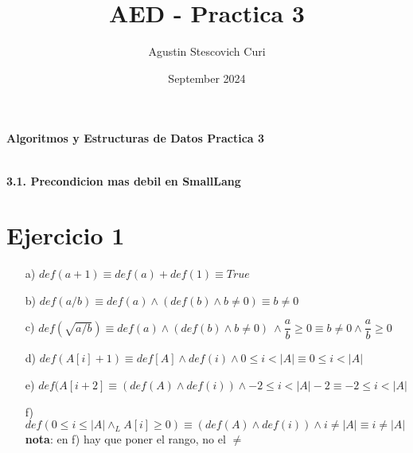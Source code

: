 \documentclass{article}
\title{AED - Practica 3}
\author{Agustin Stescovich Curi}
\date{September 2024}
\begin{document}
\renewcommand{\labelenumi}{\alpha}
\newcommand{\IfElse}[3]{\textbf{if }(#1)\textbf{ then } \\#2\\ \textbf{else }\\#3\\ \textbf{ endif}}
\newcommand{\In}{\textit{in}}
\newcommand{\Inout}{\textit{inout}}
\newcommand{\Out}{\textit{out}}
\newcommand{\ent}{\mathbb{Z}}
\newcommand{\real}{\mathbb{R}}
\newcommand{\requiere}[1]{
    \texttt{\hspace{1cm}requiere}:\{#1\}\\
}
\newcommand{\asegura}[1]{
    \texttt{\hspace{1cm}asegura}:\{#1\}\\
}


\begin{center}
    \Huge{\textbf{Algoritmos y Estructuras de Datos Practica 3}}\\
\end{center}
\ \\
\huge{\textbf{3.1. Precondicion mas debil en SmallLang}}
\section*{Ejercicio 1}
\large{
\begin{itemize}
    \item [a) ] $def(a+1)\equiv def(a)+def(1)\equiv True$
    \item [b) ] $def(a/b)\equiv def(a) \land (def(b) \land b\neq0) \equiv b\neq0$
    \item [c) ] $def(\sqrt{a/b})\equiv def(a)\land (def(b) \land b\neq0)\ \land \dfrac{a}{b}\geq0\equiv b\neq0 \land \dfrac{a}{b}\geq0 $
    \item [d) ] $def(A[i]+1)\equiv def[A] \land def(i) \land 0\leq i<|A| \equiv 0\leq i<|A|$
    \item [e) ] $def(A[i+2]\equiv (def(A) \land def(i))\land -2\leq i<|A|-2 \equiv -2\leq i<|A|$
    \item [f) ] $def(0\leq i\leq|A| \land_L A[i]\geq0)\equiv (def(A)\land def(i)) \land i\neq|A|\equiv i\neq|A|$\\
    \textbf{nota}: en f) hay que poner el rango, no el $\neq$
\end{itemize}}
\end{document}
